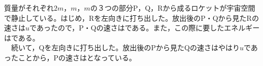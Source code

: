 \hakosyokika
\item
    \begin{mawarikomi}{120pt}{}
        質量がそれぞれ$2m$，$m$，$m$の３つの部分P，Q，Rから成るロケットが宇宙空間で静止している。はじめ，Rを左向きに打ち出した。放出後のP・Qから見たRの速さは$u$であったので，P・Qの速さは\Hako である。また，この際に要したエネルギーは\Hako である。\\
        ~~続いて，Qを左向きに打ち出した。放出後のPから見たQの速さはやはり$u$であったことから，Pの速さは\Hako となっている。
    \end{mawarikomi}
